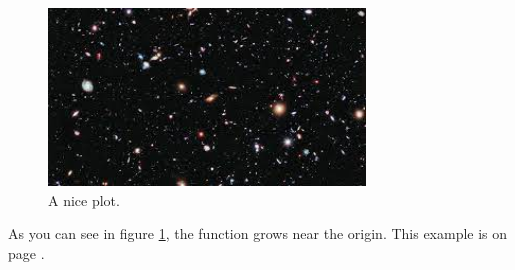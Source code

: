\documentclass{article}
\begin{document}
\begin{figure}[h]
    \centering
    \includegraphics[width=0.75\textwidth]{Universe}
    \caption{A nice plot.}
    \label{fig:mesh1}
\end{figure}

As you can see in figure \ref{fig:mesh1}, the function grows near the origin. This example is on page \pageref{fig:mesh1}.
\end{document}
